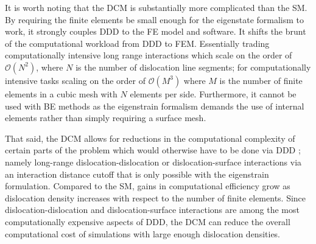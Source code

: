 It is worth noting that the DCM is substantially more complicated than the SM. By requiring the finite elements be small enough for the eigenstate formalism to work, it strongly couples DDD to the FE model and software. It shifts the brunt of the computational workload from DDD to FEM. Essentially trading computationally intensive long range interactions which scale on the order of $ \mathcal{O}(N^{2}) $, where $ N $ is the number of dislocation line segments; for computationally intensive tasks scaling on the order of $ \mathcal{O}(M^{3}) $ where $ M $ is the number of finite elements in a cubic mesh with $ N $ elements per side. Furthermore, it cannot be used with BE methods as the eigenstrain formalism demands the use of internal elements rather than simply requiring a surface mesh.

That said, the DCM allows for reductions in the computational complexity of certain parts of the problem which would otherwise have to be done via DDD \cite{dcm}; namely long-range dislocation-dislocation or dislocation-surface interactions via an interaction distance cutoff that is only possible with the eigenstrain formulation. Compared to the SM, gains in computational efficiency grow as dislocation density increases with respect to the number of finite elements. Since dislocation-dislocation and dislocation-surface interactions are among the most computationally expensive aspects of DDD, the DCM can reduce the overall computational cost of simulations with large enough dislocation densities.
